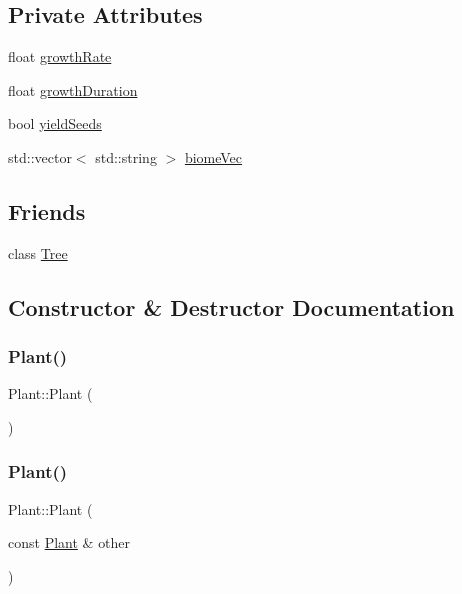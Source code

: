 \subsection*{Private Attributes}
\begin{DoxyCompactItemize}
\item 
float \mbox{\hyperlink{class_plant_a3e0a3a4109fe0ce37eb56576cb06c2aa}{growth\+Rate}}
\item 
float \mbox{\hyperlink{class_plant_aa17e87fd95a8d188c3ad4fe12d68befa}{growth\+Duration}}
\item 
bool \mbox{\hyperlink{class_plant_ab4d4894c58e27f62622b1a9388538b96}{yield\+Seeds}}
\item 
std\+::vector$<$ std\+::string $>$ \mbox{\hyperlink{class_plant_a452989226b807a8ef885fc810a1e7f17}{biome\+Vec}}
\end{DoxyCompactItemize}
\subsection*{Friends}
\begin{DoxyCompactItemize}
\item 
class \mbox{\hyperlink{class_plant_a4b682814d14447120dd184fd300deade}{Tree}}
\end{DoxyCompactItemize}


\subsection{Constructor \& Destructor Documentation}
\mbox{\label{class_plant_aeebba67fbf33e3087e9035f41289a83a}} 
\subsubsection{\texorpdfstring{Plant()}{Plant()}\hspace{0.1cm}{\footnotesize\ttfamily [1/2]}}
{\footnotesize\ttfamily Plant\+::\+Plant (\begin{DoxyParamCaption}{ }\end{DoxyParamCaption})}

\mbox{\label{class_plant_a3e454c81c5a9120c4b321614b22621c1}} 
\subsubsection{\texorpdfstring{Plant()}{Plant()}\hspace{0.1cm}{\footnotesize\ttfamily [2/2]}}
{\footnotesize\ttfamily Plant\+::\+Plant (\begin{DoxyParamCaption}\item[{const \mbox{\hyperlink{class_plant}{Plant}} \&}]{other }\end{DoxyParamCaption})}



